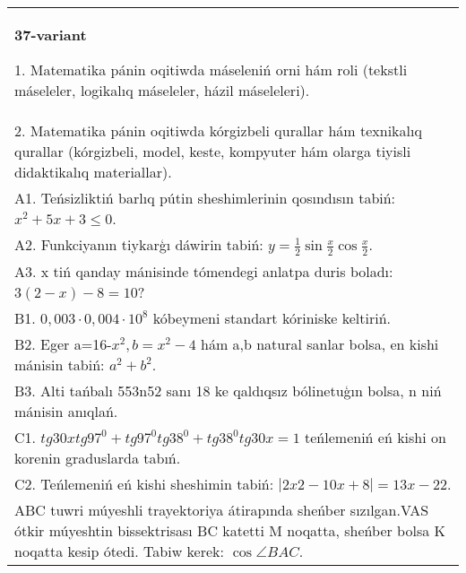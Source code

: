 \documentclass{article}
\begin{document}
\begin{tabular}{m{17cm}}
\textbf{37-variant}

1. Matematika pánin oqitiwda máseleniń orni hám roli (tekstli máseleler, logikalıq máseleler, házil máseleleri). \\
2. Matematika pánin oqitiwda kórgizbeli qurallar hám texnikalıq qurallar (kórgizbeli, model, keste, kompyuter hám olarga tiyisli didaktikalıq materiallar). \\
A1. Teńsizliktiń barlıq pútin sheshimlerinin qosındısın tabiń: \(x^2 + 5x + 3 \leq 0\). \\
A2. Funkciyanın tiykarģı dáwirin tabiń: \(y = \frac{1}{2}\sin{\frac{x}{2}\cos\frac{x}{2}}\). \\
A3. x tiń qanday mánisinde tómendegi anlatpa duris boladı: \(3 (2 - x) - 8 = 10\)? \\
B1. \(0,003 \cdot 0,004 \cdot 10^{8}\) kóbeymeni standart kóriniske keltiriń. \\
B2. Eger a=16-\(x^2, b=x^2 - 4\) hám a,b natural sanlar bolsa, en kishi mánisin tabiń: \(a^2 + b^2\). \\
B3. Alti tańbalı 553n52 sanı 18 ke qaldıqsız bólinetuģın bolsa, n niń mánisin anıqlań. \\
C1. \(tg30xtg97^{0} + tg97^{0}tg38^{0} + tg38^{0}tg30x = 1\) teńlemeniń eń kishi on korenin graduslarda tabıń. \\
C2. Teńlemeniń eń kishi sheshimin tabiń: \(\left| 2x2 - 10x + 8 \right| = 13x - 22\). \\
ABC tuwri múyeshli trayektoriya átirapında sheńber sızılgan.VAS ótkir múyeshtin bissektrisası BC katetti M noqatta, sheńber bolsa K noqatta kesip ótedi. Tabiw kerek: \(\cos\angle BAC\). \\

\end{tabular}
\vspace{1cm}
\end{document}
